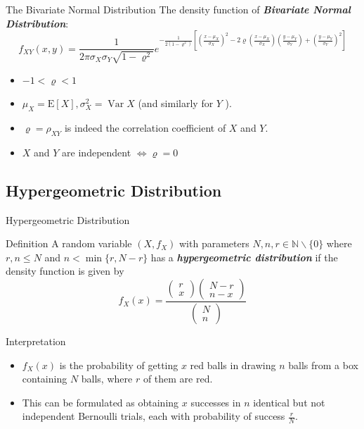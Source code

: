 \documentclass{beamer}
\newcommand{\bb}[1]{\textcolor{antiquefuchsia}{\textbf{\textit{#1}}}}
\begin{document}
\begin{frame}{The Bivariate Normal Distribution}
The density function of \bb{Bivariate Normal Distribution}:
$$
f_{X Y}(x, y)=\frac{1}{2 \pi \sigma_{X} \sigma_{Y} \sqrt{1-\varrho^{2}}} e^{-\frac{1}{2\left(1-\varrho^{2}\right)}\left[\left(\frac{x-\mu_{X}}{\sigma_{X}}\right)^{2}-2 \varrho\left(\frac{x-\mu_{X}}{\sigma_{X}}\right)\left(\frac{y-\mu_{Y}}{\sigma_{Y}}\right)+\left(\frac{y-\mu_{Y}}{\sigma_{Y}}\right)^{2}\right]}
$$
\begin{itemize}
\item $-1<\varrho<1$
\item $\mu_{X}=\mathrm{E}[X], \sigma_{X}^{2}=\operatorname{Var} X$ (and similarly for $Y$ ).
\item $\varrho=\rho_{X Y}$ is indeed the correlation coefficient of $X$ and $Y$.
\item $X$ and $Y$ are independent $\Longleftrightarrow \varrho=0$
\end{itemize}
\end{frame}

\subsection{Hypergeometric Distribution}
\begin{frame}{Hypergeometric Distribution}
\begin{block}{Definition}
A random variable $\left(X, f_{X}\right)$ with parameters $N, n, r \in \mathbb{N} \backslash\{0\}$ where $r, n \leq N$ and $n<\min \{r, N-r\}$ has a \bb{hypergeometric distribution} if the density function is given by
$$
f_{X}(x)=\frac{\left(\begin{array}{l}
r \\
x
\end{array}\right)\left(\begin{array}{l}
N-r \\
n-x
\end{array}\right)}{\left(\begin{array}{l}
N \\
n
\end{array}\right)}
$$

\end{block}
\begin{block}{Interpretation}
\begin{itemize}
\item $f_{X}(x)$ is the probability of getting $x$ red balls in drawing $n$ balls from a box containing $N$ balls, where $r$ of them are red.
\item This can be formulated as obtaining $x$ successes in $n$ identical but not independent Bernoulli trials, each with probability of success $\frac{r}{N}$.
\end{itemize}
\end{block}
\end{frame}
\end{document}
